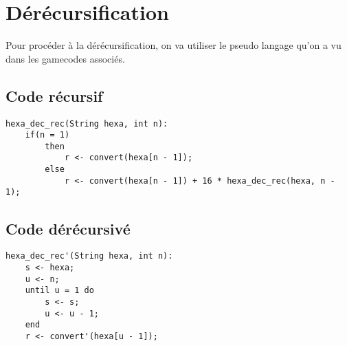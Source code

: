 \documentclass[a4paper, 11pt, oneside]{article}
\begin{document}
\section{Dérécursification}\label{derecur}
%
%
Pour procéder à la dérécursification, on va utiliser le pseudo langage qu'on a vu dans les gamecodes associés.

\subsection{Code récursif}

\begin{lstlisting}
hexa_dec_rec(String hexa, int n):
    if(n = 1)
        then
            r <- convert(hexa[n - 1]);
        else
            r <- convert(hexa[n - 1]) + 16 * hexa_dec_rec(hexa, n - 1);
\end{lstlisting}

\subsection{Code dérécursivé}

\begin{lstlisting}
hexa_dec_rec'(String hexa, int n):
    s <- hexa;
    u <- n;
    until u = 1 do
        s <- s;
        u <- u - 1;
    end
    r <- convert'(hexa[u - 1]);
\end{lstlisting}
\end{document}

